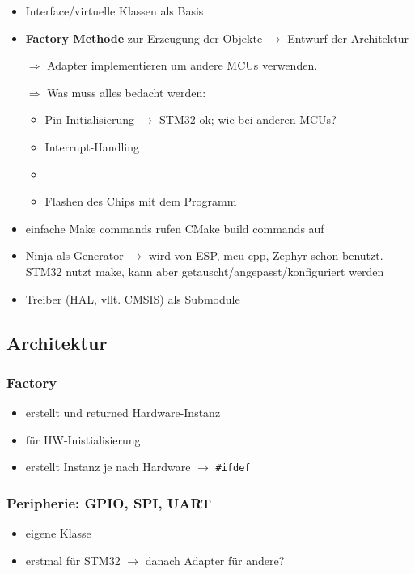 \begin{itemize}
	\item Interface/virtuelle Klassen als Basis
	\item \textbf{Factory Methode} zur Erzeugung der Objekte $\rightarrow$ Entwurf der Architektur
	\item [$\Rightarrow$] Adapter implementieren um andere MCUs verwenden.
	\item [$\Rightarrow$] Was muss alles bedacht werden:
	\begin{itemize}
		\item Pin Initialisierung $\rightarrow$ STM32 ok; wie bei anderen MCUs?
		\item Interrupt-Handling
		\item 
		\item Flashen des Chips mit dem Programm
	\end{itemize}
	\item einfache Make commands rufen CMake build commands auf
	\item Ninja als Generator $\rightarrow$ wird von ESP, mcu-cpp, Zephyr schon benutzt. STM32 nutzt make, kann aber getauscht/angepasst/konfiguriert werden
	\item Treiber (HAL, vllt. CMSIS) als Submodule
\end{itemize}

\subsection{Architektur}
\subsubsection*{Factory}
\begin{itemize}
	\item erstellt und returned Hardware-Instanz
	\item für HW-Inistialisierung
	\item erstellt Instanz je nach Hardware $\rightarrow$ \texttt{\#ifdef}
\end{itemize}

\subsubsection*{Peripherie: GPIO, SPI, UART}
\begin{itemize}
	\item eigene Klasse
	\item erstmal für STM32 $\rightarrow$ danach Adapter für andere?
\end{itemize}

